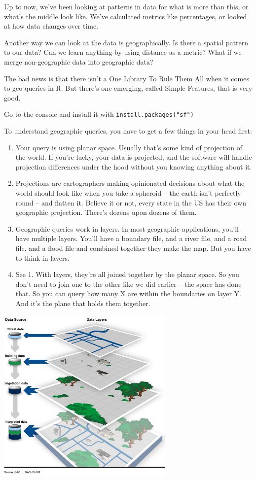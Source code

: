 \documentclass[
  letterpaper,
  DIV=11,
  numbers=noendperiod]{scrreprt}
\providecommand{\tightlist}{%
  \setlength{\itemsep}{0pt}\setlength{\parskip}{0pt}}\usepackage{longtable,booktabs,array}
\begin{document}
Up to now, we've been looking at patterns in data for what is more than
this, or what's the middle look like. We've calculated metrics like
percentages, or looked at how data changes over time.

Another way we can look at the data is geographically. Is there a
spatial pattern to our data? Can we learn anything by using distance as
a metric? What if we merge non-geographic data into geographic data?

The bad news is that there isn't a One Library To Rule Them All when it
comes to geo queries in R. But there's one emerging, called Simple
Features, that is very good.

Go to the console and install it with \texttt{install.packages("sf")}

To understand geographic queries, you have to get a few things in your
head first:

\begin{enumerate}
\def\labelenumi{\arabic{enumi}.}
\tightlist
\item
  Your query is using planar space. Usually that's some kind of
  projection of the world. If you're lucky, your data is projected, and
  the software will handle projection differences under the hood without
  you knowing anything about it.
\item
  Projections are cartographers making opinionated decisions about what
  the world should look like when you take a spheroid -- the earth isn't
  perfectly round -- and flatten it. Believe it or not, every state in
  the US has their own geographic projection. There's dozens upon dozens
  of them.
\item
  Geographic queries work in layers. In most geographic applications,
  you'll have multiple layers. You'll have a boundary file, and a river
  file, and a road file, and a flood file and combined together they
  make the map. But you have to think in layers.
\item
  See 1. With layers, they're all joined together by the planar space.
  So you don't need to join one to the other like we did earlier -- the
  space has done that. So you can query how many X are within the
  boundaries on layer Y. And it's the plane that holds them together.
\end{enumerate}

\includegraphics[width=3.41in,height=\textheight]{./images/geolayers.jpg}
\end{document}
